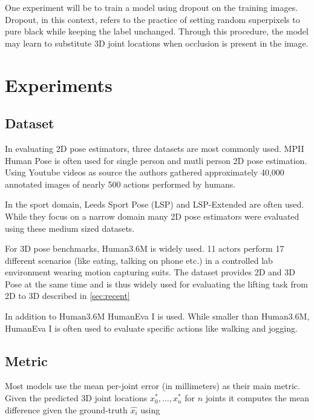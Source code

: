 \documentclass[twoside]{article}
\begin{document}
\begin{multicols}{2}
One experiment will be to train a model using dropout on the training images.
Dropout, in this context, refers to the practice of setting random superpixels to pure black while keeping the label unchanged.
Through this procedure, the model may learn to substitute 3D joint locations when occlusion is present in the image.

\section{Experiments}
\subsection{Dataset}
\label{sec:dataset}

In evaluating 2D pose estimators, three datasets are most commonly used.
MPII Human Pose \cite{andriluka_2d_2014} is often used for single person and mutli person 2D pose estimation.
Using Youtube videos as source the authors gathered approximately 40,000 annotated images of nearly 500 actions performed by humans. 

In the sport domain, Leeds Sport Pose (LSP) \cite{johnson_clustered_2010} and LSP-Extended \cite{johnson_learning_2011} are often used.
While they focus on a narrow domain many 2D pose estimators were evaluated using these medium sized datasets.

For 3D pose benchmarks, Human3.6M \cite{ionescu_human3.6m:_2014} is widely used.
11 actors perform 17 different scenarios (like eating, talking on phone etc.) in a controlled lab environment wearing motion capturing suits.
The dataset provides 2D and 3D Pose at the same time and is thus widely used for evaluating the lifting task from 2D to 3D described in \ref{sec:recent}

In addition to Human3.6M HumanEva I \cite{sigal_humaneva:_2010} is used.
While smaller than Human3.6M, HumanEva I is often used to evaluate specific actions like walking and jogging.


\subsection{Metric}

Most models use the mean per-joint error (in millimeters) as their main metric.
Given the predicted 3D joint locations $x_0^{*}, \dots, x_n^{*}$ for $n$ joints it computes the mean difference given the ground-truth $\hat{x_i}$ using


\end{multicols}
\end{document}
